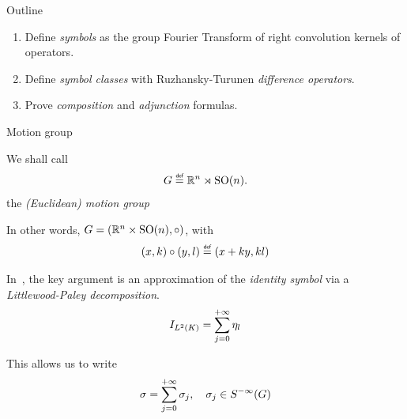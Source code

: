 \documentclass[handout]{beamer}
\begin{document}
\begin{frame}{Outline}
    \begin{enumerate}
        \item Define \emph{symbols} as the group Fourier Transform of right convolution kernels of operators.
        \item Define \emph{symbol classes} with Ruzhansky-Turunen \emph{difference operators}.
        \item Prove \emph{composition} and \emph{adjunction} formulas.
    \end{enumerate}
\end{frame}

\begin{frame}{Motion group}
    \begin{definition}
        We shall call
        \begin{align*}
            \Group \defeq \R^n \rtimes \SpecialOrthogonalGroup n.
        \end{align*}
        the \emph{(Euclidean) motion group}
    \end{definition}

    \pause

    In other words, $G = (\mathbb{R}^n \times {\mathrm{SO} (n)}, \circ)$,
    with
    \begin{align*}
        (x, k) \circ (y, l) \defeq (x + k y, k l)
    \end{align*}
\end{frame}

\begin{frame}
    In~\cite{Fischer2015,FischerRuzhansky16},
    the key argument is an approximation of the \emph{identity symbol} via a \emph{Littlewood-Paley decomposition}.
    \begin{align*}
        {I_{{L^{2} (K)}}} = \sum_{j = 0}^{+ \infty} \eta_l
    \end{align*}

    This allows us to write
    \begin{align*}
        \sigma = \sum_{j = 0}^{+ \infty} \sigma_j,
        \quad
        \sigma_j \in {S^{-\infty} (G)}
    \end{align*}
\end{frame}
\end{document}
